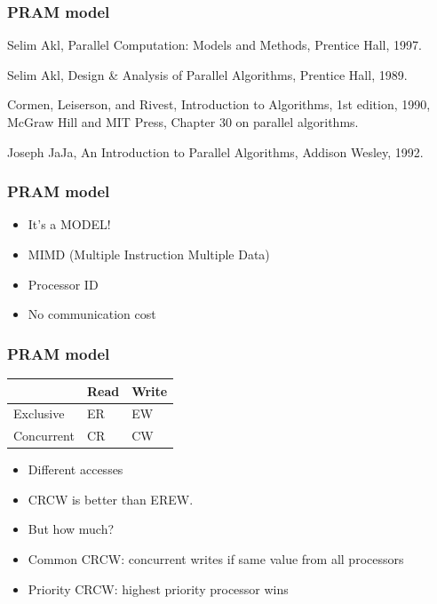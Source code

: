 \documentclass[14pt]{beamer}
\begin{document}
\begin{frame}\frametitle{PRAM model}
\begin{references}
Selim Akl, Parallel Computation: Models and Methods, Prentice Hall, 1997.    

\+
Selim Akl, Design \& Analysis of Parallel Algorithms, Prentice Hall, 1989.

\+
Cormen, Leiserson, and Rivest, Introduction to Algorithms, 1st edition,
1990, McGraw Hill and MIT Press, Chapter 30 on parallel algorithms.

\+
Joseph JaJa, An Introduction to Parallel Algorithms, Addison Wesley, 1992.
\end{references}
\end{frame}

\begin{frame}\frametitle{PRAM model}
  \begin{itemize}
  \item
    It's a \alert{MODEL}!
  \item
    MIMD (Multiple Instruction Multiple Data)
  \item
    Processor ID
  \item
    No communication cost
  \end{itemize}
\end{frame}

\begin{frame}\frametitle{PRAM model}
\begin{center}
  \begin{tabular}{|l|l|l|}
\hline
 & Read & Write \\
\hline
Exclusive & ER & EW \\
\hline
Concurrent & CR & CW \\
\hline
\end{tabular}

\begin{itemize}
\item
  Different accesses
  \item
    CRCW is better than EREW.
  \item
    But how much?
  \item
    Common CRCW: concurrent writes if same value from all processors
  \item
    Priority CRCW: highest priority processor wins
  \end{itemize}
\end{center}
\end{frame}
\end{document}

